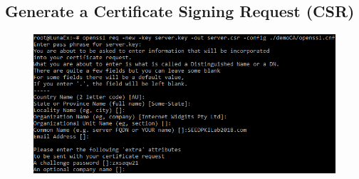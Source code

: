\documentclass{article}
\begin{document}
\subsection{Generate a Certificate Signing Request (CSR)}
\begin{figure}[H]\centering\includegraphics[width=\textwidth]{2-2.png}\end{figure}
\end{document}
